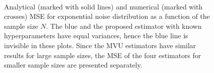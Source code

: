 \documentclass{article}
\begin{document}
\begin{figure}[!ht]
	\centering
	\begin{minipage}[t]{1\linewidth}
	\centering
{}
\hfil
{}
\caption{Analytical (marked with solid lines) and numerical (marked with crosses) MSE for exponential noise distribution as a function of the sample size $N$.  The blue and the proposed estimator with known hyperparameters have equal variances, hence the blue line is invisible in these plots. Since the MVU estimators have similar results for large sample sizes, the MSE of the four estimators for smaller sample sizes are presented separately.}
\label{fig:exponential_blue_mvu}
	\end{minipage}%
	\\
	\vspace{5mm}
	\begin{minipage}[t]{1\linewidth}
	\centering
{}
\end{minipage}
\end{figure}
\end{document}
